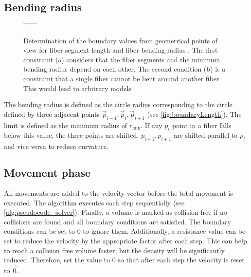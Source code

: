 \subsection{Bending radius}
%
\begin{figure}[!t]
    \centering
    \setlength{\tikzheight}{.42\textwidth}
    \setlength{\tabcolsep}{0pt}
    \begin{tabular}{C{0.5\textwidth}C{0.5\textwidth}}
     &
     \\
     &
    \end{tabular}
	\caption{Determination of the boundary values from geometrical points of view for fiber segment length \segLength{} and fiber bending radius \segRadius{}. The first constraint (a) considers that the fiber segments and the minimum bending radius depend on each other. The second condition (b) is a constraint that a single fiber cannot be bent around another fiber. This would lead to arbitrary models.}
	\label{fig:modelCircle}
\end{figure}
%
The bending radius is defined as the circle radius corresponding to the circle defined by three adjacent points $\vec{p}_{i-1}, \vec{p}_{i}, \vec{p}_{i+1}$ (see \cref{fig:boundaryLength}).
The limit is defined as the minimum radius of $r_{\min}$.
If any $p_{i}$ point in a fiber falls below this value, the three points are shifted.
$p_{i-1},p_{i+1}$ are shifted parallel to $p_{i}$ and vice versa to reduce curvature.
%
% 
% 
\subsection{Movement phase}
% 
All movements are added to the velocity vector before the total movement is executed.
The algorithm executes each step sequentially (see \cref{alg:pseudocode_solver}).
Finally, a volume is marked as collision-free if no collisions are found and all boundary conditions are satisfied.
The boundary conditions can be set to $0$ to ignore them.
Additionally, a resistance value can be set to reduce the velocity by the appropriate factor after each step.
This can help to reach a collision free volume faster, but the density will be significantly reduced.
Therefore, set the value to $0$ so that after each step the velocity is reset to $\vec{0}$.
% 
% 
% 

